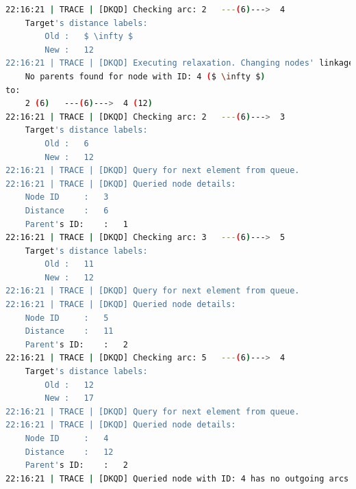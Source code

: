 \begin{lstlisting}[mathescape,language=bash]
22:16:21 | TRACE | [DKQD] Checking arc:	2	---(6)--->	4
	Target's distance labels:
		Old	:	$ \infty $
		New	:	12
22:16:21 | TRACE | [DKQD] Executing relaxation. Changing nodes' linkage from:
	No parents found for node with ID: 4 ($ \infty $)
to:
	2 (6)	---(6)--->	4 (12)
22:16:21 | TRACE | [DKQD] Checking arc:	2	---(6)--->	3
	Target's distance labels:
		Old	:	6
		New	:	12
22:16:21 | TRACE | [DKQD] Query for next element from queue.
22:16:21 | TRACE | [DKQD] Queried node details:
	Node ID		:	3
	Distance	:	6
	Parent's ID:	:	1
22:16:21 | TRACE | [DKQD] Checking arc:	3	---(6)--->	5
	Target's distance labels:
		Old	:	11
		New	:	12
22:16:21 | TRACE | [DKQD] Query for next element from queue.
22:16:21 | TRACE | [DKQD] Queried node details:
	Node ID		:	5
	Distance	:	11
	Parent's ID:	:	2
22:16:21 | TRACE | [DKQD] Checking arc:	5	---(6)--->	4
	Target's distance labels:
		Old	:	12
		New	:	17
22:16:21 | TRACE | [DKQD] Query for next element from queue.
22:16:21 | TRACE | [DKQD] Queried node details:
	Node ID		:	4
	Distance	:	12
	Parent's ID:	:	2
22:16:21 | TRACE | [DKQD] Queried node with ID: 4 has no outgoing arcs.
\end{lstlisting}
\normalsize